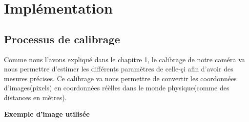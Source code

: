 
\chapter{Implémentation} %

\label{Chapter2} %

  
\section{Processus de calibrage}

Comme nous l'avons expliqué dans le chapitre 1, le calibrage de notre caméra va nous permettre d'estimer les différents paramètres de celle-çi afin d'avoir des mesures précises. Ce calibrage va nous permettre de convertir les coordonnées d'images(pixels) en coordonnées réèlles dans le monde physique(comme des distances en mètres).
   
   \textbf{Exemple d'image utilisée}









